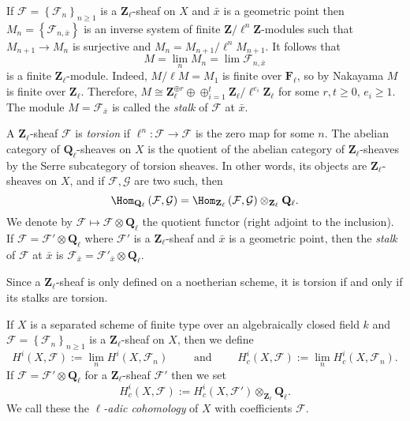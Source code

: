 \begin{remark}
\label{remark-stalk-l-adic-sheaf}
If $\mathcal{F} = \left\{\mathcal{F}_n\right\}_{n\geq 1}$ is a
$\mathbf{Z}_\ell$-sheaf on $X$ and $\bar x$ is a geometric point then
$M_n=\left\{\mathcal{F}_{n, \bar x}\right\}$ is an inverse system of finite
$\mathbf{Z}/\ell^n\mathbf{Z}$-modules such that $M_{n+1}\to M_n$ is surjective
and $M_n = M_{n+1}/\ell^n M_{n+1}$. It follows that
$$
M = \lim_n M_n = \lim \mathcal{F}_{n, \bar x}
$$
is a finite $\mathbf{Z}_\ell$-module. Indeed, $M/\ell M= M_1$ is finite over
$\mathbf{F}_\ell$, so by Nakayama $M$ is finite over $\mathbf{Z}_\ell$.
Therefore, $M\cong \mathbf{Z}_\ell^{\oplus r} \oplus \oplus_{i=1}^t
\mathbf{Z}_\ell/\ell^{e_i}\mathbf{Z}_\ell$ for some $r, t\geq 0$, $e_i\geq 1$.
The module $M = \mathcal{F}_{\bar x}$ is called the {\it stalk} of
$\mathcal{F}$ at $\bar x$.
\end{remark}

\begin{definition}
\label{definition-torsion-l-adic-sheaf}
A $\mathbf{Z}_\ell$-sheaf $\mathcal{F}$ is {\it torsion} if $\ell^n:
\mathcal{F} \to \mathcal{F}$ is the zero map for some $n$. The abelian category
of $\mathbf{Q}_\ell$-sheaves on $X$ is the quotient of the abelian category of
$\mathbf{Z}_\ell$-sheaves by the Serre subcategory of torsion sheaves. In
other words, its objects are $\mathbf{Z}_\ell$-sheaves on $X$, and if
$\mathcal{F}, \mathcal{G}$ are two such, then
$$
\Hom_{\mathbf{Q}_\ell} \left(\mathcal{F}, \mathcal{G} \right) =
\Hom_{\mathbf{Z}_\ell} \left(\mathcal{F}, \mathcal{G}\right)
\otimes_{\mathbf{Z}_\ell} \mathbf{Q}_\ell.
$$
We denote by $\mathcal{F} \mapsto \mathcal{F} \otimes \mathbf{Q}_\ell$ the
quotient functor (right adjoint to the inclusion). If $\mathcal{F} =
\mathcal{F}' \otimes \mathbf{Q}_\ell$ where $\mathcal{F}'$ is a
$\mathbf{Z}_\ell$-sheaf and $\bar x$ is a geometric point, then the
{\it stalk} of $\mathcal{F}$ at $\bar x$ is $\mathcal{F}_{\bar x} =
\mathcal{F}'_{\bar x} \otimes \mathbf{Q}_\ell$.
\end{definition}

\begin{remark}
\label{remark-torsion-stalks}
Since a $\mathbf{Z}_\ell$-sheaf is only defined on a noetherian scheme, it is
torsion if and only if its stalks are torsion.
\end{remark}

\begin{definition}
\label{definition-cohomology-l-adic}
If $X$ is a separated scheme of finite type over an algebraically closed field
$k$ and $\mathcal{F} = \left\{\mathcal{F}_n\right\}_{n\geq 1}$ is a
$\mathbf{Z}_\ell$-sheaf on $X$, then we define
$$
H^i(X, \mathcal{F}) := \lim_n H^i(X, \mathcal{F}_n)
\qquad\text{ and }\qquad
H_c^i(X, \mathcal{F}) := \lim_n H_c^i(X, \mathcal{F}_n).
$$
If $\mathcal{F} = \mathcal{F}'\otimes \mathbf{Q}_\ell$ for a
$\mathbf{Z}_\ell$-sheaf $\mathcal{F}'$ then we set
$$
H_c^i(X , \mathcal{F}) := H_c^i(X,
\mathcal{F}')\otimes_{\mathbf{Z}_\ell}\mathbf{Q}_\ell.
$$
We call these the {\it $\ell$-adic cohomology} of $X$ with coefficients
$\mathcal{F}$.
\end{definition}





